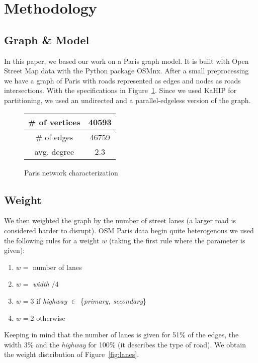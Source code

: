 \section{Methodology}
\label{sec:methodology}

\subsection*{Graph \& Model}
In this paper, we based our work on a Paris graph model. It is built with Open Street Map data with the Python package OSMnx. After a small preprocessing we have a graph of Paris with roads represented as edges and nodes as roads intersections. With the specifications in Figure~\ref{fig:characterization}. Since we used KaHIP for partitioning, we used an undirected and a parallel-edgeless version of the graph.
\begin{figure}[!hbt]
    \begin{center}
        \begin{tabular}{ | c c | }
        \hline
         \# of vertices & 40593 \\
        \hline 
         \# of edges & 46759 \\
        \hline
         avg. degree & 2.3 \\
        \hline
        \end{tabular}
        \caption{Paris network characterization}
        \label{fig:characterization}
    \end{center}
\end{figure}

\subsection*{Weight}
We then weighted the graph by the number of street lanes (a larger road is considered harder to disrupt). OSM Paris data begin quite heterogenous we used the following rules for a weight $w$ (taking the first rule where the parameter is given):
\begin{enumerate}
    \item $w =$ number of lanes
    \item $w =$ \textit{width} $/ 4$
    \item $w = 3$ if \textit{highway} $\in$ \{\textit{primary, secondary}\} \item $w = 2$ otherwise
\end{enumerate}
Keeping in mind that the number of lanes is given for 51\% of the edges, the width 3\% and the \textit{highway} for 100\% (it describes the type of road). We obtain the weight distribution of Figure~\ref{fig:lanes}.

